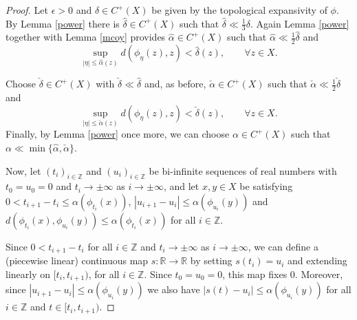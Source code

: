 \documentclass[11pt,letterpaper]{amsart}
\begin{document}
\begin{proof}
Let $\epsilon>0$ and $\delta\in C^+(X)$ be given by the topological expansivity of $\phi$.
By  Lemma \ref{power} there is $\hat{\delta}\in C^+(X)$ such that
$
\hat{\delta}\ll \frac{1}3\delta.
$
Again Lemma \ref{power} together with Lemma \ref{mcoy} provides $\hat{\alpha}\in C^+(X)$ such that
$
\hat{\alpha}\ll \frac{1}2\hat{\delta}
$
and
\begin{equation}
\label{cha}
\sup_{|\eta|\leq \hat{\alpha}(z)}d(\phi_\eta(z),z)<\hat{\delta}(z),\quad\quad\forall z\in X.
\end{equation}

Choose $\check{\delta}\in C^+(X)$ with $\check{\delta}\ll \hat{\delta}$ and, as before, $\check{\alpha}\in C^+(X)$ such that
$
\check{\alpha}\ll \frac{1}2\check{\delta}
$
and
\begin{equation}
\label{chacho}
\sup_{|\eta|\leq \check{\alpha}(z)}d(\phi_\eta(z),z)<\check{\delta}(z),\quad\quad\forall z\in X.
\end{equation}
Finally, by Lemma \ref{power} once more, we can choose $\alpha\in C^+(X)$ such that $\alpha\ll\min\{\hat{\alpha},\check{\alpha}\}$.

Now, let $(t_i)_{i\in\mathbb{Z}}$ and $(u_i)_{i\in\mathbb{Z}}$ be bi-infinite sequences of real numbers with $t_0=u_0=0$ and $t_i\to\pm\infty$ as $i\to\pm\infty$, and let $x,y\in X$ be satisfying
$0<t_{i+1}-t_i\leq\alpha(\phi_{t_i}(x))$, $|u_{i+1}-u_i|\leq\alpha(\phi_{u_i}(y))$ and 
$d(\phi_{t_i}(x),\phi_{u_i}(y))\leq\alpha(\phi_{t_i}(x))$ for all $i\in\mathbb{Z}$.

Since $0<t_{i+1}-t_i$ for all $i\in\mathbb{Z}$ and $t_i\to\pm\infty$ as $i\to\pm\infty$, we can define a (piecewise linear) continuous map
$s:\mathbb{R}\to\mathbb{R}$ by setting $s(t_i)=u_i$ and extending linearly on $[t_i,t_{i+1})$,
for all $i\in\mathbb{Z}$.
Since $t_0=u_0=0$, this map fixes $0$.
Moreover, since $|u_{i+1}-u_i|\leq\alpha(\phi_{u_i}(y))$ we also have $|s(t)-u_i|\leq \alpha(\phi_{u_i}(y))$ for all $i\in\mathbb{Z}$ and $t\in [t_i,t_{i+1})$.


\end{proof}
\end{document}
